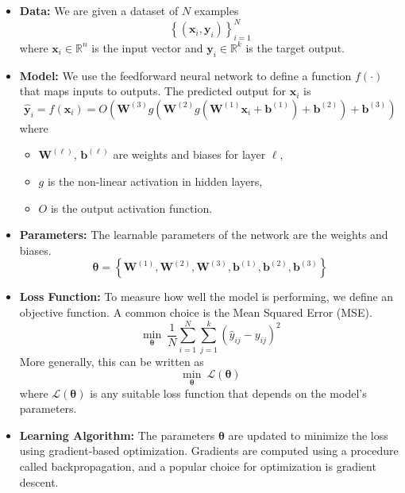 \vspace{1em}
\begin{itemize}
    \item \textbf{Data:} We are given a dataset of \( N \) examples
    \[
    \left\{ (\mathbf{x}_i, \mathbf{y}_i) \right\}_{i=1}^{N}
    \]
    where \( \mathbf{x}_i \in \mathbb{R}^n \) is the input vector and \( \mathbf{y}_i \in \mathbb{R}^k \) is the target output.

    \item \textbf{Model:} We use the feedforward neural network to define a function \( f(\cdot) \) that maps inputs to outputs. The predicted output for \( \mathbf{x}_i \) is
    \[
    \hat{\mathbf{y}}_i = f(\mathbf{x}_i) = O\left( \mathbf{W}^{(3)} g\left( \mathbf{W}^{(2)} g\left( \mathbf{W}^{(1)} \mathbf{x}_i + \mathbf{b}^{(1)} \right) + \mathbf{b}^{(2)} \right) + \mathbf{b}^{(3)} \right)
    \]
    where
    \begin{itemize}
        \item \( \mathbf{W}^{(\ell)} \), \( \mathbf{b}^{(\ell)} \) are weights and biases for layer \( \ell \),
        \item \( g \) is the non-linear activation in hidden layers,
        \item \( O \) is the output activation function.
    \end{itemize}

    \item \textbf{Parameters:} The learnable parameters of the network are the weights and biases. 
    \[
    \boldsymbol{\theta} = \left\{ \mathbf{W}^{(1)}, \mathbf{W}^{(2)}, \mathbf{W}^{(3)}, \mathbf{b}^{(1)}, \mathbf{b}^{(2)}, \mathbf{b}^{(3)} \right\}
    \]

    \item \textbf{Loss Function:} To measure how well the model is performing, we define an objective function. A common choice is the Mean Squared Error (MSE).
    \[
    \min_{\boldsymbol{\theta}} \ \frac{1}{N} \sum_{i=1}^{N} \sum_{j=1}^{k} \left( \hat{y}_{ij} - y_{ij} \right)^2
    \]
    More generally, this can be written as
    \[
    \min_{\boldsymbol{\theta}} \ \mathcal{L}(\boldsymbol{\theta})
    \]
    where \( \mathcal{L}(\boldsymbol{\theta}) \) is any suitable loss function that depends on the model’s parameters.

    \item \textbf{Learning Algorithm:} The parameters \( \boldsymbol{\theta} \) are updated to minimize the loss using gradient-based optimization. Gradients are computed using a procedure called backpropagation, and a popular choice for optimization is gradient descent.
\end{itemize}

